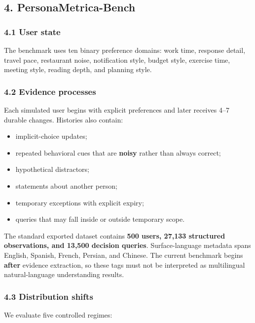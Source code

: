 \documentclass[
  10pt,
  letterpaper,
]{article}
\providecommand{\tightlist}{%
  \setlength{\itemsep}{0pt}\setlength{\parskip}{0pt}}
\begin{document}
\subsection{4. PersonaMetrica-Bench}\label{personametrica-bench}

\subsubsection{4.1 User state}\label{user-state}

The benchmark uses ten binary preference domains: work time, response
detail, travel pace, restaurant noise, notification style, budget style,
exercise time, meeting style, reading depth, and planning style.

\subsubsection{4.2 Evidence processes}\label{evidence-processes}

Each simulated user begins with explicit preferences and later receives
4--7 durable changes. Histories also contain:

\begin{itemize}
\tightlist
\item
  implicit-choice updates;
\item
  repeated behavioral cues that are \textbf{noisy} rather than always
  correct;
\item
  hypothetical distractors;
\item
  statements about another person;
\item
  temporary exceptions with explicit expiry;
\item
  queries that may fall inside or outside temporary scope.
\end{itemize}

The standard exported dataset contains \textbf{500 users, 27,133
structured observations, and 13,500 decision queries}. Surface-language
metadata spans English, Spanish, French, Persian, and Chinese. The
current benchmark begins \textbf{after} evidence extraction, so these
tags must not be interpreted as multilingual natural-language
understanding results.

\subsubsection{4.3 Distribution shifts}\label{distribution-shifts}

We evaluate five controlled regimes:
\end{document}
